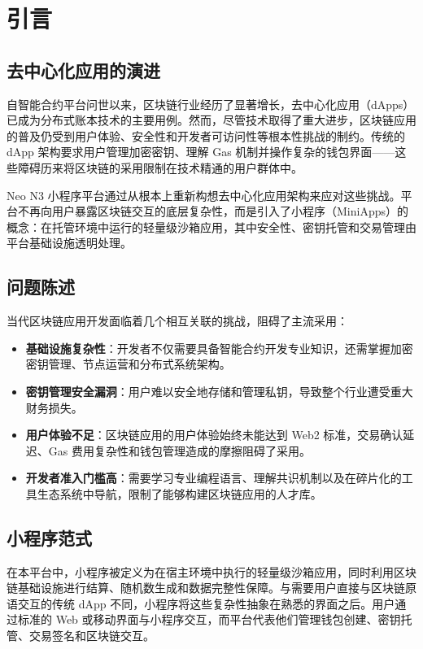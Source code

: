 \documentclass[11pt,a4paper]{article}
\begin{document}
\section{引言}

\subsection{去中心化应用的演进}

自智能合约平台问世以来，区块链行业经历了显著增长，去中心化应用（dApps）已成为分布式账本技术的主要用例。然而，尽管技术取得了重大进步，区块链应用的普及仍受到用户体验、安全性和开发者可访问性等根本性挑战的制约。传统的 dApp 架构要求用户管理加密密钥、理解 Gas 机制并操作复杂的钱包界面——这些障碍历来将区块链的采用限制在技术精通的用户群体中。

Neo N3 小程序平台通过从根本上重新构想去中心化应用架构来应对这些挑战。平台不再向用户暴露区块链交互的底层复杂性，而是引入了小程序（MiniApps）的概念：在托管环境中运行的轻量级沙箱应用，其中安全性、密钥托管和交易管理由平台基础设施透明处理。

\subsection{问题陈述}

当代区块链应用开发面临着几个相互关联的挑战，阻碍了主流采用：

\begin{itemize}
    \item \textbf{基础设施复杂性}：开发者不仅需要具备智能合约开发专业知识，还需掌握加密密钥管理、节点运营和分布式系统架构。
    \item \textbf{密钥管理安全漏洞}：用户难以安全地存储和管理私钥，导致整个行业遭受重大财务损失。
    \item \textbf{用户体验不足}：区块链应用的用户体验始终未能达到 Web2 标准，交易确认延迟、Gas 费用复杂性和钱包管理造成的摩擦阻碍了采用。
    \item \textbf{开发者准入门槛高}：需要学习专业编程语言、理解共识机制以及在碎片化的工具生态系统中导航，限制了能够构建区块链应用的人才库。
\end{itemize}

\subsection{小程序范式}

在本平台中，小程序被定义为在宿主环境中执行的轻量级沙箱应用，同时利用区块链基础设施进行结算、随机数生成和数据完整性保障。与需要用户直接与区块链原语交互的传统 dApp 不同，小程序将这些复杂性抽象在熟悉的界面之后。用户通过标准的 Web 或移动界面与小程序交互，而平台代表他们管理钱包创建、密钥托管、交易签名和区块链交互。
\end{document}
